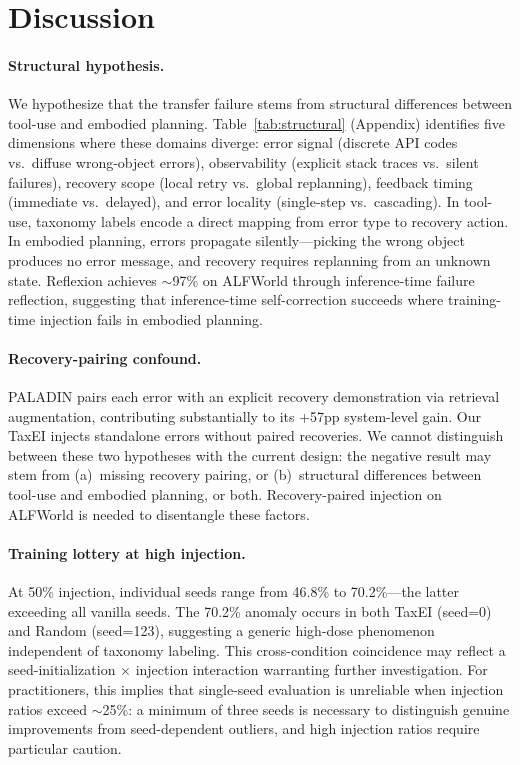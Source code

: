\section{Discussion}
\label{sec:discussion}

\paragraph{Structural hypothesis.}
We hypothesize that the transfer failure stems from structural differences between tool-use and embodied planning. Table~\ref{tab:structural} (Appendix) identifies five dimensions where these domains diverge: error signal (discrete API codes vs.\ diffuse wrong-object errors), observability (explicit stack traces vs.\ silent failures), recovery scope (local retry vs.\ global replanning), feedback timing (immediate vs.\ delayed), and error locality (single-step vs.\ cascading). In tool-use, taxonomy labels encode a direct mapping from error type to recovery action. In embodied planning, errors propagate silently---picking the wrong object produces no error message, and recovery requires replanning from an unknown state. Reflexion \cite{shinn2023reflexion} achieves $\sim$97\% on ALFWorld through inference-time failure reflection, suggesting that inference-time self-correction succeeds where training-time injection fails in embodied planning.

\paragraph{Recovery-pairing confound.}
PALADIN pairs each error with an explicit recovery demonstration via retrieval augmentation, contributing substantially to its +57pp system-level gain. Our TaxEI injects standalone errors without paired recoveries. We cannot distinguish between these two hypotheses with the current design: the negative result may stem from (a)~missing recovery pairing, or (b)~structural differences between tool-use and embodied planning, or both. Recovery-paired injection on ALFWorld is needed to disentangle these factors.

\paragraph{Training lottery at high injection.}
At 50\% injection, individual seeds range from 46.8\% to 70.2\%---the latter exceeding all vanilla seeds. The 70.2\% anomaly occurs in both TaxEI (seed=0) and Random (seed=123), suggesting a generic high-dose phenomenon independent of taxonomy labeling. This cross-condition coincidence may reflect a seed-initialization $\times$ injection interaction warranting further investigation. For practitioners, this implies that single-seed evaluation is unreliable when injection ratios exceed $\sim$25\%: a minimum of three seeds is necessary to distinguish genuine improvements from seed-dependent outliers, and high injection ratios require particular caution.

